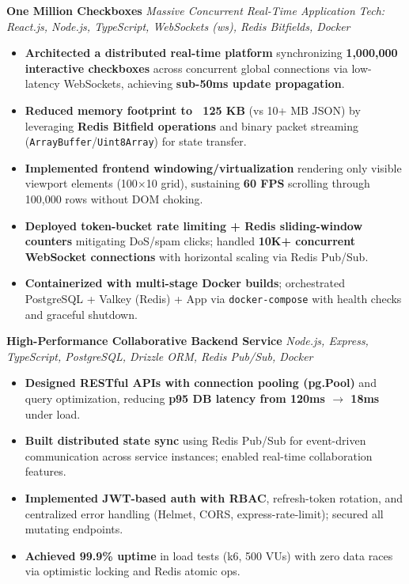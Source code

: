 \documentclass[10pt,a4paper]{article}
\newcommand{\projecttitle}[2]{\textbf{#1} \hfill \textit{#2}}
\newcommand{\techstack}[1]{\textit{Tech: #1}}
\begin{document}
\projecttitle{One Million Checkboxes}{Massive Concurrent Real-Time Application}
\techstack{React.js, Node.js, TypeScript, WebSockets (ws), Redis Bitfields, Docker} \\[2pt]
\begin{itemize}
    \item \textbf{Architected a distributed real-time platform} synchronizing \textbf{1,000,000 interactive checkboxes} across concurrent global connections via low-latency WebSockets, achieving \textbf{sub-50ms update propagation}.
    \item \textbf{Reduced memory footprint to ~125 KB} (vs 10+ MB JSON) by leveraging \textbf{Redis Bitfield operations} and binary packet streaming (\texttt{ArrayBuffer}/\texttt{Uint8Array}) for state transfer.
    \item \textbf{Implemented frontend windowing/virtualization} rendering only visible viewport elements (100$\times$10 grid), sustaining \textbf{60 FPS} scrolling through 100,000 rows without DOM choking.
    \item \textbf{Deployed token-bucket rate limiting + Redis sliding-window counters} mitigating DoS/spam clicks; handled \textbf{10K+ concurrent WebSocket connections} with horizontal scaling via Redis Pub/Sub.
    \item \textbf{Containerized with multi-stage Docker builds}; orchestrated PostgreSQL + Valkey (Redis) + App via \texttt{docker-compose} with health checks and graceful shutdown.
\end{itemize}
\vspace{4pt}

\projecttitle{High-Performance Collaborative Backend Service}{Node.js, Express, TypeScript, PostgreSQL, Drizzle ORM, Redis Pub/Sub, Docker}
\begin{itemize}
    \item \textbf{Designed RESTful APIs with connection pooling (pg.Pool)} and query optimization, reducing \textbf{p95 DB latency from 120ms $\to$ 18ms} under load.
    \item \textbf{Built distributed state sync} using Redis Pub/Sub for event-driven communication across service instances; enabled real-time collaboration features.
    \item \textbf{Implemented JWT-based auth with RBAC}, refresh-token rotation, and centralized error handling (Helmet, CORS, express-rate-limit); secured all mutating endpoints.
    \item \textbf{Achieved 99.9\% uptime} in load tests (k6, 500 VUs) with zero data races via optimistic locking and Redis atomic ops.
\end{itemize}
\end{document}

